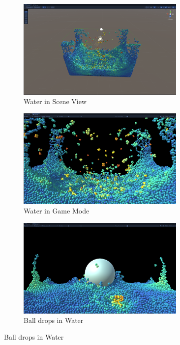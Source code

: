 \documentclass{article}
\begin{document}
\begin{figure}[h]
    \centering
    \begin{subfigure}[b]{0.33\textwidth}
        \centering
        \includegraphics[width=0.9\textwidth]{water_model_mode.png}
        \caption{Water in Scene View}
        \label{fig:higher_velocity}
    \end{subfigure}%
    \hfill %
    \begin{subfigure}[b]{0.33\textwidth}
        \centering
        \includegraphics[width=0.9\textwidth]{water_game_mode.png}
        \caption{Water in Game Mode}
        \label{fig:lower_velocity}
    \end{subfigure}
        \begin{subfigure}[b]{0.33\textwidth}
        \centering
        \includegraphics[width=0.9\textwidth]{ball_water.png}
        \caption{Ball drops in Water}
        \label{fig:lower_velocity}
    \end{subfigure}
\end{figure}
\end{document}
